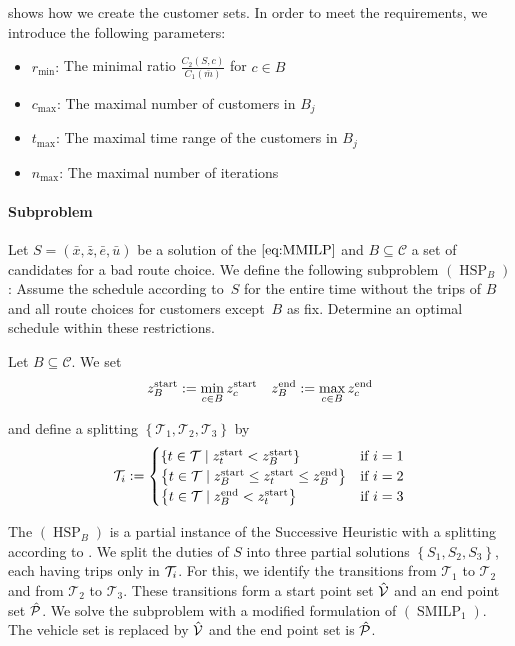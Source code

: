  shows how we create the customer sets. In order to meet the requirements, we introduce the following parameters:
\begin{itemize}
	\item{$r_{\min}$:} The minimal ratio $\frac{C_2(S,c)}{C_1\left(\bar{m}\right)}$ for ${c\in B}$
	\item{$c_{\max}$:} The maximal number of customers in $B_j$
	\item{$t_{\max}$:} The maximal time range of the customers in $B_j$
	\item{$n_{\max}$:} The maximal number of iterations
\end{itemize}

\paragraph{Subproblem} \parfill

Let $S=\left(\bar{x},\bar{z},\bar{e},\bar{u}\right)$ be a solution of the $\eqref{eq:MMILP}$ and $B\subseteq\mathcal{C}$ a set of candidates for a bad route choice. We define the following subproblem $(\operatorname{HSP}_B)$: Assume the schedule according to~$S$ for the entire time without the trips of $B$ and all route choices for customers except~$B$ as fix. Determine an optimal schedule within these restrictions.

\begin{definition}
\label{def:splitting_HSP}

Let ${B\subseteq\mathcal{C}}$. We set
\begin{align*}
	z^{\operatorname{start}}_B := \min_{c\in B}z^{\operatorname{start}}_c && z^{\operatorname{end}}_B := \max_{c\in B}z^{\operatorname{end}}_c
\end{align*}

and define a splitting $\left\{\mathcal{T}_1,\mathcal{T}_2,\mathcal{T}_3\right\}$ by
\begin{align*}
	\mathcal{T}_i := \begin{cases}
		\left\{t\in\mathcal{T}\mid z^{\operatorname{start}}_t<z^{\operatorname{start}}_B\right\} & \text{if } i=1 \\
		\left\{t\in\mathcal{T}\mid z^{\operatorname{start}}_B\leq z^{\operatorname{start}}_t\leq z^{\operatorname{end}}_B\right\} & \text{if } i=2 \\
		\left\{t\in\mathcal{T}\mid z^{\operatorname{end}}_B<z^{\operatorname{start}}_t\right\} & \text{if } i=3
	\end{cases}
\end{align*}

\end{definition}

The $(\operatorname{HSP}_B)$ is a partial instance of the Successive Heuristic with a splitting according to . We split the duties of $S$ into three partial solutions $\left\{S_1,S_2,S_3\right\}$, each having trips only in $\mathcal{T}_i$. For this, we identify the transitions from $\mathcal{T}_1$ to $\mathcal{T}_2$ and from $\mathcal{T}_2$ to $\mathcal{T}_3$. These transitions form a start point set $\hat{\mathcal{V}}$ and an end point set $\hat{\mathcal{P}}$. We solve the subproblem with a modified formulation of $(\operatorname{SMILP}_1)$. The vehicle set is replaced by $\hat{\mathcal{V}}$ and the end point set is $\hat{\mathcal{P}}$. 

